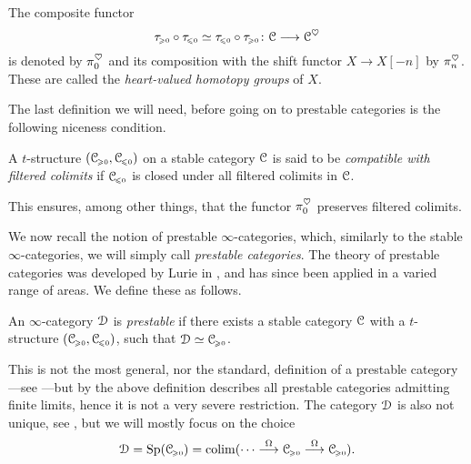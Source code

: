 \begin{definition}
    The composite functor 
    \[\tau_{\hspace{-1pt}\scriptscriptstyle\geqslant 0}\circ\tau_{\hspace{-1pt}\scriptscriptstyle\leqslant 0}\simeq\tau_{\hspace{-1pt}\scriptscriptstyle\leqslant 0}\circ\tau_{\hspace{-1pt}\scriptscriptstyle\geqslant 0} \colon \EuScript{C}\longrightarrow \EuScript{C}^\heartsuit\]
    is denoted by $\pi_0^\heartsuit$ and its composition with the shift functor $X\to X[-n]$ by $\pi_n^\heartsuit$. These are called the \emph{heart-valued homotopy groups} of $X$. 
\end{definition}

The last definition we will need, before going on to prestable categories is the following niceness condition. 

\begin{definition}
    A $t$-structure $(\EuScript{C}_{\hspace{-1pt}\scriptscriptstyle\geqslant 0}, \EuScript{C}_{\hspace{-1pt}\scriptscriptstyle\leqslant 0})$ on a stable category $\EuScript{C}$ is said to be \emph{compatible with filtered colimits} if $\EuScript{C}_{\hspace{-1pt}\scriptscriptstyle\leqslant 0}$ is closed under all filtered colimits in $\EuScript{C}$. 
\end{definition}

\begin{remark}
    This ensures, among other things, that the functor $\pi_0^\heartsuit$ preserves filtered colimits. 
\end{remark}

We now recall the notion of prestable $\infty$-categories, which, similarly to the stable $\infty$-categories, we will simply call \emph{prestable categories}. The theory of prestable categories was developed by Lurie in \cite[App. C]{lurie_SAG}, and has since been applied in a varied range of areas. We define these as follows. 

\begin{definition}
    An $\infty$-category $\EuScript{D}$ is \emph{prestable} if there exists a stable category $\EuScript{C}$ with a $t$-structure $(\EuScript{C}_{\hspace{-1pt}\scriptscriptstyle\geqslant 0}, \EuScript{C}_{\hspace{-1pt}\scriptscriptstyle\leqslant 0})$, such that $\EuScript{D}\simeq \EuScript{C}_{\hspace{-1pt}\scriptscriptstyle\geqslant 0}$.
\end{definition}

\begin{remark}
    This is not the most general, nor the standard, definition of a prestable category---see \cite[C.1.2.1]{lurie_SAG}---but by \cite[C.1.2.9]{lurie_SAG} the above definition describes all prestable categories admitting finite limits, hence it is not a very severe restriction. The category $\EuScript{D}$ is also not unique, see \cite[C.1.2.10]{lurie_SAG}, but we will mostly focus on the choice 
    \[\EuScript{D}=\mathrm{Sp}(\EuScript{C}_{\hspace{-1pt}\scriptscriptstyle\geqslant 0}) = \operatorname{colim} (\cdots\overset{\Omega}{\longrightarrow}\EuScript{C}_{\hspace{-1pt}\scriptscriptstyle\geqslant 0}\overset{\Omega}{\longrightarrow}\EuScript{C}_{\hspace{-1pt}\scriptscriptstyle\geqslant 0}).\]
\end{remark}

